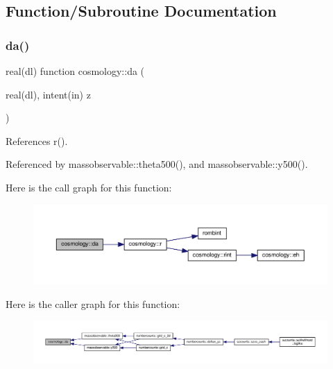 \subsection{Function/\+Subroutine Documentation}
\mbox{\label{namespacecosmology_a17233f8902b8f4b3f66ff1bfb3406c05}} 
\subsubsection{\texorpdfstring{da()}{da()}}
{\footnotesize\ttfamily real(dl) function cosmology\+::da (\begin{DoxyParamCaption}\item[{real(dl), intent(in)}]{z }\end{DoxyParamCaption})}



References r().



Referenced by massobservable\+::theta500(), and massobservable\+::y500().

Here is the call graph for this function\+:
\nopagebreak
\begin{figure}[H]
\begin{center}
\leavevmode
\includegraphics[width=350pt]{namespacecosmology_a17233f8902b8f4b3f66ff1bfb3406c05_cgraph}
\end{center}
\end{figure}
Here is the caller graph for this function\+:
\nopagebreak
\begin{figure}[H]
\begin{center}
\leavevmode
\includegraphics[width=350pt]{namespacecosmology_a17233f8902b8f4b3f66ff1bfb3406c05_icgraph}
\end{center}
\end{figure}
\mbox{\label{namespacecosmology_a38a12dc082adc18d1fc8a043bd39405c}} 
